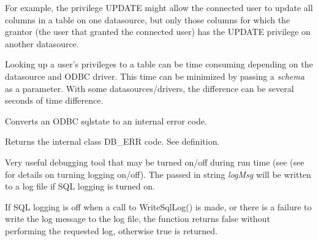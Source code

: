 For example, the privilege UPDATE might allow the connected user to update
all columns in a table on one datasource, but only those columns for
which the grantor (the user that granted the connected user) has the UPDATE
privilege on another datasource.

Looking up a user's privileges to a table can be time consuming depending on the
datasource and ODBC driver.  This time can be minimized by passing a {\it schema}
as a parameter.  With some datasources/drivers, the difference can be several
seconds of time difference.


\label{wxdbtranslatesqlstate}


Converts an ODBC sqlstate to an internal error code.




Returns the internal class DB\_ERR code.  See  definition.

\label{wxdbwritesqllog}





Very useful debugging tool that may be turned on/off during run time (see
(see  for details on
turning logging on/off).  The passed in string {\it logMsg} will be written to
a log file if SQL logging is turned on.


If SQL logging is off when a call to WriteSqlLog() is made, or there is a
failure to write the log message to the log file, the function returns
false without performing the requested log, otherwise true is returned.



\section{}\label{wxdbcoldataptr}

